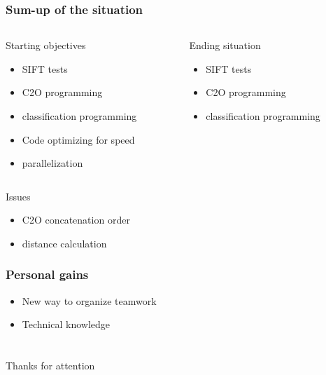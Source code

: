 \documentclass[xcolor=table]{beamer}
\begin{document}
\begin{frame} \frametitle{Sum-up of the situation}

\begin{columns}[t]
  \begin{column}{5cm}
  \begin{block}{Starting objectives}
	\begin{itemize}
		\item SIFT tests
		\item C2O programming
		\item classification programming
		\item Code optimizing for speed
		\item parallelization
	\end{itemize}
  \end{block}
  \end{column}

  \begin{column}{5cm}
  \begin{block}{Ending situation}
  \begin{itemize}
		\item SIFT tests
		\item C2O programming
		\item classification programming
  \end{itemize}
  \end{block}
  \end{column}
 \end{columns}

\begin{alertblock}{Issues}
	\begin{itemize}
		\item C2O concatenation order
		\item distance calculation
	\end{itemize}	
\end{alertblock}
\end{frame}



\begin{frame}\frametitle{Personal gains}
\begin{itemize}
	\item New way to organize teamwork
	\item Technical knowledge
\end{itemize}

\end{frame}



\section{}
\begin{frame}\frametitle{}
    \begin{center}
        Thanks for attention
    \end{center}
\end{frame}
\end{document}

